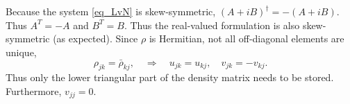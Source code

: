 \documentclass[11pt]{article}
\begin{document}
Because the system \eqref{eq_LvN} is skew-symmetric, $(A + i B)^\dag = - (A + i B)$. Thus $A^T=-A$ and $B^T =
B$. Thus the real-valued formulation is also skew-symmetric (as expected). Since $\rho$ is
Hermitian, not all off-diagonal elements are unique,
\[
\rho_{jk} = \bar{\rho}_{kj},\quad \Rightarrow\quad u_{jk} = u_{kj},\quad v_{jk} = - v_{kj}.
\]
Thus only the lower triangular part of the density matrix needs to be stored. Furthermore, $v_{jj}=0$.



\end{document}
